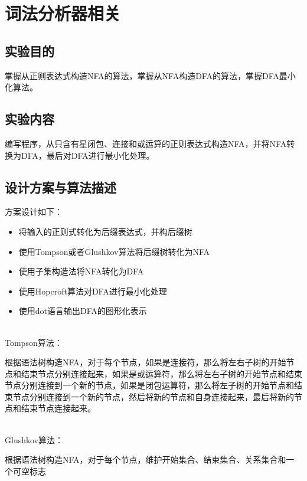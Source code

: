 \documentclass{hdureport}
\date{\today}
\begin{document}
\makecover

\setcounter{secnumdepth}{3}
\setcounter{tocdepth}{3}

\tableofcontents

\newpage

\section{词法分析器相关}

\subsection{实验目的}
掌握从正则表达式构造NFA的算法，掌握从NFA构造DFA的算法，掌握DFA最小化算法。
\subsection{实验内容}
编写程序，从只含有星闭包、连接和或运算的正则表达式构造NFA，并将NFA转换为DFA，最后对DFA进行最小化处理。
\subsection{设计方案与算法描述}

方案设计如下：
\begin{itemize}
    \item{将输入的正则式转化为后缀表达式，并构后缀树}
    \item{使用Tompson或者Glushkov算法将后缀树转化为NFA}
    \item{使用子集构造法将NFA转化为DFA}
    \item{使用Hopcroft算法对DFA进行最小化处理}
    \item{使用dot语言输出DFA的图形化表示}
\end{itemize}

\quad \\ 

Tompson算法：

根据语法树构造NFA，对于每个节点，如果是连接符，那么将左右子树的开始节点和结束节点分别连接起来，如果是或运算符，那么将左右子树的开始节点和结束节点分别连接到一个新的节点，如果是闭包运算符，那么将左子树的开始节点和结束节点分别连接到一个新的节点，然后将新的节点和自身连接起来，最后将新的节点和结束节点连接起来。

\quad \\ 

Glushkov算法：

根据语法树构造NFA，对于每个节点，维护开始集合、结束集合、关系集合和一个可空标志
\end{document}
